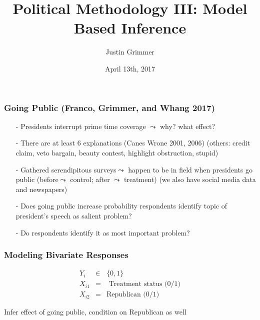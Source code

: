 \documentclass{beamer}
\title[Methodology III] %
{Political Methodology III: Model Based Inference}
\author{Justin Grimmer}
\institute[Stanford University]{Associate Professor\\Department of Political Science \\  Stanford University}
\date{April 13th, 2017}
\begin{document}
\begin{frame}
\titlepage
\end{frame}


\begin{frame}


\end{frame}

\begin{frame}
\frametitle{Going Public (Franco, Grimmer, and Whang 2017)}

\begin{itemize}
\item[-] Presidents interrupt prime time coverage $\leadsto$ why? what effect?
\item[-] There are at least 6 explanations (Canes Wrone 2001, 2006) (others: credit claim, veto bargain, beauty contest, highlight obstruction, stupid)
\item[-] Gathered serendipitous surveys$\leadsto$ happen to be in field when presidents go public (before$\leadsto$ control; after $\leadsto$ treatment) (we also have social media data and newspapers)
\item[-] Does going public increase probability respondents identify topic of president's speech as salient problem?
\item[-] Do respondents identify it as most important problem?
\end{itemize}



\end{frame}






\begin{frame}
\frametitle{Modeling Bivariate Responses}

\begin{eqnarray}
Y_{i} & \in &  \{0, 1\} \nonumber \\
X_{i1} & = & \text{ Treatment status (0/1)}  \nonumber \\
X_{i2} & = & \text{Republican (0/1)} \nonumber
\end{eqnarray}

Infer effect of going public, condition on Republican as well  \\

\pause
{}


\end{frame}
\end{document}
